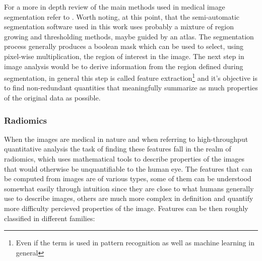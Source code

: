 For a more in depth review of the main methods used in medical image segmentation refer to \cite{Medical_img_segmentation}. Worth noting, at this point, that the semi-automatic segmentation software used in this work uses probably a mixture of region growing and thresholding methods, maybe guided by an atlas.
The segmentation process generally produces a boolean mask which can be used to select, using pixel-wise multiplication, the region of interest in the image. The next step in image analysis would be to derive information from the region defined during segmentation, in general this step is called feature extraction\footnote{Even if the term is used in pattern recognition as well as machine learning in general} and it's objective is to find non-redundant quantities that meaningfully summarize as much properties of the original data as possible.

\subsubsection{Radiomics}
 When the images are medical in nature and when referring to high-throughput quantitative analysis the task of finding these features fall in the realm of radiomics, which uses mathematical tools to describe properties of the images that would otherwise be unquantifiable to the human eye. The features that can be computed from images are of various types, some of them can be understood somewhat easily through intuition since they are close to what humans generally use to describe images, others are much more complex in definition and quantify more difficulty percieved properties of the image. Features can be then roughly classified in different families:

